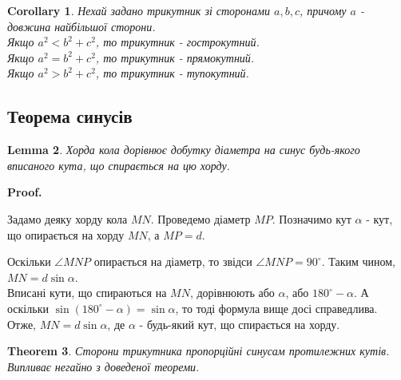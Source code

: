 \documentclass[a4paper, 10pt]{article}
\makeatletter
\def\qed{$\blacksquare$}
\theoremstyle{theoremdd}
\newtheorem{theorem}{Theorem}[subsection]
\theoremstyle{theoremdd}
\theoremstyle{theoremdd}
\theoremstyle{theoremdd}
\theoremstyle{theoremdd}
\theoremstyle{theoremdd}
\theoremstyle{theoremdd}
\theoremstyle{theoremdd}
\newtheorem{lemma}[theorem]{Lemma}
\theoremstyle{theoremdd}
\newtheorem{corollary}[theorem]{Corollary}
\renewenvironment{proof}[1][Proof.\\]{\par
\pushQED{\hfill \qed}%
\normalfont \topsep6\p@\@plus6\p@\relax
\trivlist
\item\relax
{\bfseries
#1\@addpunct{.}}\hspace\labelsep\ignorespaces
}{%
\popQED\endtrivlist\@endpefalse
}
\makeatother
\begin{document}
\begin{corollary}
Нехай задано трикутник зі сторонами $a,b,c$, причому $a$ - довжина найбільшої сторони.\\
Якщо $a^2 < b^2 + c^2$, то трикутник - гострокутний.\\
Якщо $a^2 = b^2 + c^2$, то трикутник - прямокутний.\\
Якщо $a^2 > b^2 + c^2$, то трикутник - тупокутний.
\end{corollary}

\subsection{Теорема синусів}
\begin{lemma}
Хорда кола дорівнює добутку діаметра на синус будь-якого вписаного кута, що спирається на цю хорду.
\end{lemma}

\begin{proof}
Задамо деяку хорду кола $MN$. Проведемо діаметр $MP$. Позначимо кут $\alpha$ - кут, що опирається на хорду $MN$, а $MP = d$.
\begin{figure}[H]
\centering
{}
\end{figure}
Оскільки $\angle MNP$ опирається на діаметр, то звідси $\angle MNP = 90^\circ$. Таким чином, $MN = d \sin \alpha$.\\
Вписані кути, що спираються на $MN$, дорівнюють або $\alpha$, або $180^\circ - \alpha$. А оскільки $\sin (180^\circ - \alpha) = \sin \alpha$, то тоді формула вище досі справедлива.\\
Отже, $MN = d \sin \alpha$, де $\alpha$ - будь-який кут, що спирається на хорду.
\end{proof}

\begin{theorem}
Сторони трикутника пропорційні синусам протилежних кутів.\\
\textit{Випливає негайно з доведеної теореми.}
\end{theorem}
\end{document}
